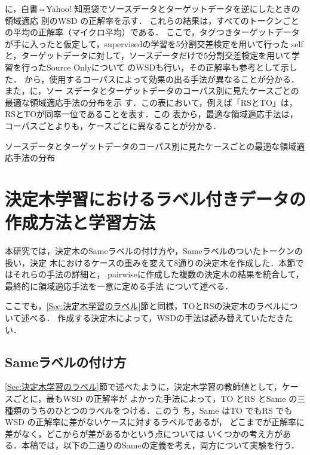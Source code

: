 \documentclass[japanese]{jnlp_1.4}
\newcommand{\tabref}[1]{}
\begin{document}
\tabref{tab:table0}に，白書⇔Yahoo! 知恵袋でソースデータとターゲットデータを逆にしたときの領域適応
別のWSD の正解率を示す．
これらの結果は，すべてのトークンごとの平均の正解率（マイクロ平均）である．
ここで，タグつきターゲットデータが手に入ったと仮定して，supervisedの学習を5分割交差検定を用いて行った
selfと，ターゲットデータに対して，ソースデータだけで5分割交差検定を用いて学習を行ったSource Onlyについて
のWSDも行い，その正解率も参考として示した．
\tabref{tab:table0}から，使用するコーパスによって効果の出る手法が異なることが分かる．
また，\tabref{ソースデータとターゲットデータのコーパス別に見たケースごとの最適な領域適応手法の分布}に，ソー
スデータとターゲットデータのコーパス別に見たケースごとの最適な領域適応手法の分布を示
す．この表において，例えば「RSとTO」は，RSとTOが同率一位であることを表す．この
表から，最適な領域適応手法は，コーパスごとよりも，ケースごとに異なることが分かる．


\begin{table}[t]
\caption{ソースデータとターゲットデータのコーパス別に見たケースごとの最適な領域適応手法の分布}
\label{ソースデータとターゲットデータのコーパス別に見たケースごとの最適な領域適応手法の分布}

\end{table}

\section{決定木学習におけるラベル付きデータの作成方法と学習方法}
\label{sec:決定木学習におけるラベル付きデータの作成方法と学習方法}

本研究では，決定木のSameラベルの付け方や，Sameラベルのついたトークンの扱い，決定
木におけるケースの重みを変えて8通りの決定木を作成した．本節ではそれらの手法の詳細と，
pairwiseに作成した複数の決定木の結果を統合して，最終的に領域適応手法を一意に定める手法
について述べる．

ここでも，\ref{Sec:決定木学習のラベル}節と同様，TOとRSの決定木のラベルについて述べる．
作成する決定木によって，WSDの手法は読み替えていただきたい．


\subsection{Sameラベルの付け方}
\label{sec:Sameラベルの付け方}

\ref{Sec:決定木学習のラベル}節で述べたように，決定木学習の教師値として，ケースごとに，最もWSD の正解率が
よかった手法によって，TO とRS とSame の三種類のうちのひとつのラベルをつける．このう
ち，Same はTO でもRS でもWSD の正解率に差がないケースに対するラベルであるが，
どこまでが正解率に差がなく，どこからが差があるかという点については
いくつかの考え方がある．本稿では，以下の二通りのSameの定義を考え，両方について実験を行う．
\end{document}
